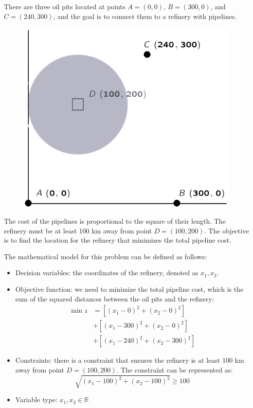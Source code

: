 \begin{example}
    There are three oil pits located at points $A=(0,0)$, $B=(300,0)$, and $C=(240,300)$, and the goal is to connect them to a refinery with pipelines.
    \begin{figure}[H]
        \centering
        \includegraphics[width=0.4\linewidth]{images/example3.png}
    \end{figure}
    The cost of the pipelines is proportional to the square of their length.
    The refinery must be at least 100 km away from point $D=(100,200)$.
    The objective is to find the location for the refinery that minimizes the total pipeline cost.

    The mathematical model for this problem can be defined as follows:
    \begin{itemize}
        \item Decision variables: the coordinates of the refinery, denoted as $x_1,x_2$. 
        \item Objective function: we need to minimize the total pipeline cost, which is the sum of the squared distances between the oil pits and the refinery:
        \begin{align*}
            \min{z} &=\left[ (x_1-0)^2+(x_2-0)^2 \right] \\
                    &+ \left[ (x_1-300)^2+(x_2-0)^2 \right] \\
                    &+ \left[ (x_1-240)^2+(x_2-300)^2 \right] 
        \end{align*}
        \item Constraints: there is a constraint that ensures the refinery is at least 100 km away from point $D=(100,200)$. 
            The constraint can be represented as:
            \[\sqrt{{\left( x_1-100 \right)}^2+{\left( x_2-100 \right)}^2} \geq 100\]
        \item Variable type: $x_1,x_2 \in \mathbb{R}$
    \end{itemize}
\end{example}